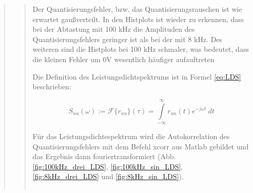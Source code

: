 \begin{quote}
\begin{quote}
        Der Quantisierungsfehler, bzw. das Quantisierungsrauschen ist wie erwartet gaußverteilt.
        In den Histplots ist wieder zu erkennen, dass bei der Abtastung mit 100 kHz die Amplituden des
        Quantisierungsfehlers geringer ist als bei der mit 8 kHz. Des weiteren sind die Histplots bei 100 kHz schmaler,
        was bedeutet, dass die kleinen Fehler um 0V wesentlich häufiger aufauftreten
        
        
        \vspace{2em}
        
        Die Definition des Leistungsdichtspektrums ist in Formel \ref{eq:LDS} beschrieben:
        
        \begin{equation}
          S_{uu}(\omega):=\mathcal{F} \{r_{uu}\}(\tau)=\int\limits_{-\infty}^{\infty} r_{uu}(t)e^{-j \omega t} \ dt
          \label{eq:LDS}
        \end{equation}
        
        
        Für das Leistungsdichtespektrum wird die Autokorrelation des Quantisierungsfehlers mit dem Befehl xcorr aus
        Matlab gebildet und das Ergebnis dann fouriertransformiert (Abb. \ref{fig:100kHz_drei_LDS},
        \ref{fig:100kHz_sin_LDS}, \ref{fig:8kHz_drei_LDS} und \ref{fig:8kHz_sin_LDS}).
        
        \begin{center}
            \begin{tabular}{ll}
            

\end{tabular}
\end{center}
\end{quote}
\end{quote}
